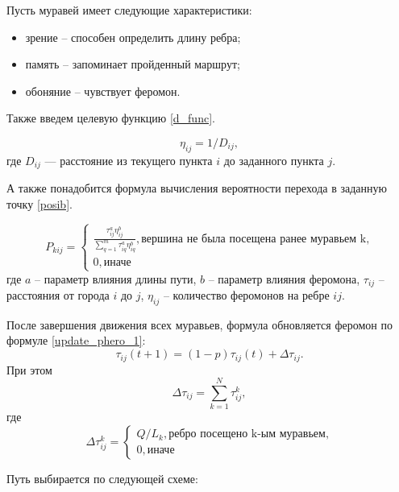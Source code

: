 Пусть муравей имеет следующие характеристики:
\begin{itemize}
	\item зрение -- способен определить длину ребра;
	\item память -- запоминает пройденный маршрут;
	\item обоняние -- чувствует феромон.
\end{itemize}


Также введем целевую функцию \eqref{d_func}.

\begin{equation}
	\label{d_func}
	\eta_{ij} = 1 / D_{ij},
\end{equation}
где $D_{ij}$ — расстояние из текущего пункта $i$ до заданного пункта $j$.


А также понадобится формула вычисления вероятности перехода в заданную точку \eqref{posib}.

\begin{equation}
	\label{posib}
	P_{kij} = \begin{cases}
		\frac{\tau_{ij}^a\eta_{ij}^b}{\sum_{q=1}^m \tau^a_{iq}\eta^b_{iq}}, \textrm{вершина не была посещена ранее муравьем k,} \\
		0, \textrm{иначе}
	\end{cases}
\end{equation}
где $a$ -- параметр влияния длины пути, $b$ -- параметр влияния феромона, $\tau_{ij}$ -- расстояния от города $i$ до $j$, $\eta_{ij}$ -- количество феромонов на ребре $ij$.

После завершения движения всех муравьев, формула обновляется феромон по формуле \eqref{update_phero_1}:
\begin{equation}
	\label{update_phero_1}
		\tau_{ij}(t+1) = (1-p)\tau_{ij}(t) + \Delta \tau_{ij}.
\end{equation}
При этом
\begin{equation}
\label{update_phero_2}
 \Delta \tau_{ij} = \sum_{k=1}^N \tau^k_{ij},
\end{equation}
где
\begin{equation}
	\label{update_phero_3}
		 \Delta\tau^k_{ij} = \begin{cases}
		Q/L_{k}, \textrm{ребро посещено k-ым муравьем,} \\
		0, \textrm{иначе}
	\end{cases}
\end{equation}


Путь выбирается по следующей схеме:

